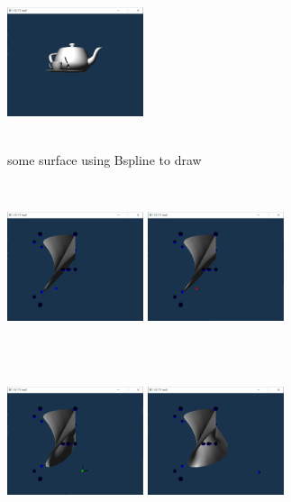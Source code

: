 \documentclass[acmtog]{acmart}
\begin{document}
\begin{figure}[h]
	\includegraphics[width=4cm,height=5cm]{bezier}
	\caption{some surface using Bspline to draw}
\end{figure}


\begin{figure}[h]
	\centering
	\includegraphics[width=4cm,height=5cm]{inter1}
	\includegraphics[width=4cm,height=5cm]{inter2}
	\includegraphics[width=4cm,height=5cm]{inter3}
	\includegraphics[width=4cm,height=5cm]{inter4}

\end{figure}
\end{document}
